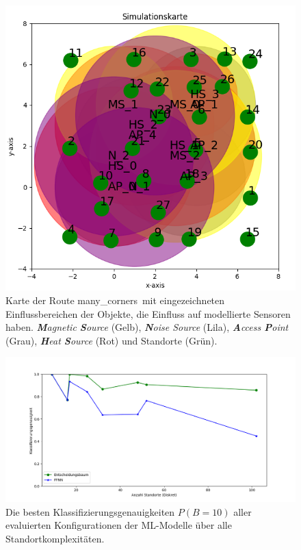 \begin{figure}[h!]
    \centering
    \includegraphics[width=0.9\linewidth]{images/many_corners_simulation_map.png}
    \caption{Karte der Route \glqq many\_corners\grqq\ mit eingezeichneten Einflussbereichen der Objekte, die Einfluss auf modellierte Sensoren haben.
    \textit{\textbf{M}agnetic \textbf{S}ource} (Gelb), \textit{\textbf{N}oise Source} (Lila), \textit{\textbf{A}ccess \textbf{P}oint} (Grau),
    \textit{\textbf{H}eat \textbf{S}ource} (Rot) und Standorte (Grün).}
    \label{fig:many_corners_simulation_map}
\end{figure}

\begin{figure}[h!]
    \centering
    \includegraphics[width=\linewidth]{images/best_dt_vs_best_ffnn_over_num_loc_using_acc_10_cont.png}
    \caption{Die besten Klassifizierungsgenauigkeiten $P(B=10)$ aller evaluierten Konfigurationen der ML-Modelle über alle Standortkomplexitäten.}
    \label{fig:best_dt_vs_best_ffnn_over_num_loc_using_acc_10_cont}
\end{figure}


